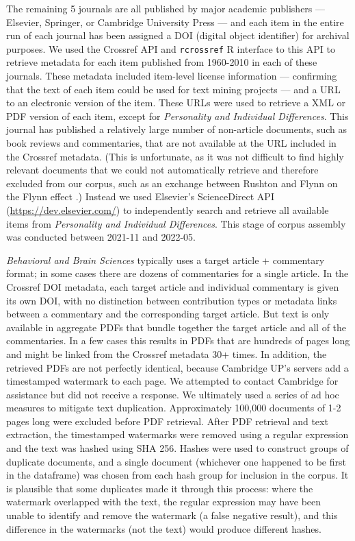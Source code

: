 \documentclass[12pt]{article}
\begin{document}
The remaining 5 journals are all published by major academic publishers --- Elsevier, Springer, or Cambridge University Press --- and each item in the entire run of each journal has been assigned a DOI (digital object identifier) for archival purposes. We used the Crossref API and \texttt{rcrossref} R interface to this API \cite[version 1.1.0.99]{ChamberlainRcrossrefClientVarious2019} to retrieve metadata for each item published from 1960-2010 in each of these journals. These metadata included item-level license information --- confirming that the text of each item could be used for text mining projects --- and a URL to an electronic version of the item. These URLs were used to retrieve a XML or PDF version of each item, except for \emph{Personality and Individual Differences}. This journal has published a relatively large number of non-article documents, such as book reviews and commentaries, that are not available at the URL included in the Crossref metadata. (This is unfortunate, as it was not difficult to find highly relevant documents that we could not automatically retrieve and therefore excluded from our corpus, such as an exchange between Rushton and Flynn on the Flynn effect \cite{FlynnEvidenceRushtonGenetic1998,RushtonSecularGainsIQ1998,FlynnReplyRushtonGang1998}.) Instead we used Elsevier's ScienceDirect API (\url{https://dev.elsevier.com/}) to independently search and retrieve all available items from \emph{Personality and Individual Differences}. This stage of corpus assembly was conducted between 2021-11 and 2022-05.

\emph{Behavioral and Brain Sciences} typically uses a target article + commentary format; in some cases there are dozens of commentaries for a single article. In the Crossref DOI metadata, each target article and individual commentary is given its own DOI, with no distinction between contribution types or metadata links between a commentary and the corresponding target article. But text is only available in aggregate PDFs that bundle together the target article and all of the commentaries. In a few cases this results in PDFs that are hundreds of pages long and might be linked from the Crossref metadata 30+ times. In addition, the retrieved PDFs are not perfectly identical, because Cambridge UP's servers add a timestamped watermark to each page. We attempted to contact Cambridge for assistance but did not receive a response. We ultimately used a series of ad hoc measures to mitigate text duplication. Approximately 100,000 documents of 1-2 pages long were excluded before PDF retrieval. After PDF retrieval and text extraction, the timestamped watermarks were removed using a regular expression and the text was hashed using SHA 256. Hashes were used to construct groups of duplicate documents, and a single document (whichever one happened to be first in the dataframe) was chosen from each hash group for inclusion in the corpus. It is plausible that some duplicates made it through this process: where the watermark overlapped with the text, the regular expression may have been unable to identify and remove the watermark (a false negative result), and this difference in the watermarks (not the text) would produce different hashes.
\end{document}
